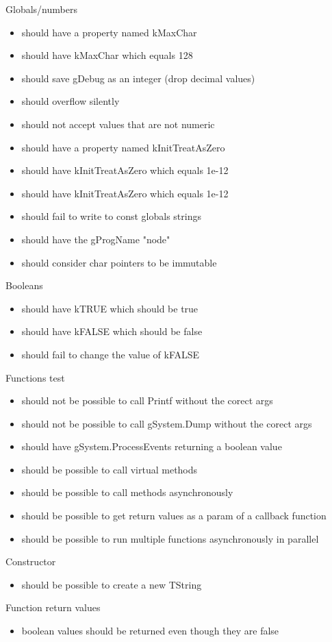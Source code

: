 Globals/numbers
\begin{itemize}
\item should have a property named kMaxChar
\item should have kMaxChar which equals 128
\item should save gDebug as an integer (drop decimal values)
\item should overflow silently
\item should not accept values that are not numeric
\item should have a property named kInitTreatAsZero
\item should have kInitTreatAsZero which equals 1e-12
\item should have kInitTreatAsZero which equals 1e-12
\item should fail to write to const globals strings
\item should have the gProgName "node"
\item should consider char pointers to be immutable
\end{itemize}

Booleans
\begin{itemize}
\item should have kTRUE which should be true
\item should have kFALSE which should be false
\item should fail to change the value of kFALSE
\end{itemize}

Functions test
\begin{itemize}
\item should not be possible to call Printf without the corect args
\item should not be possible to call gSystem.Dump without the corect args
\item should have gSystem.ProcessEvents returning a boolean value
\item should be possible to call virtual methods
\item should be possible to call methods asynchronously
\item should be possible to get return values as a param of a callback function
\item should be possible to run multiple functions asynchronously in parallel
\end{itemize}

Constructor
\begin{itemize}
\item should be possible to create a new TString
\end{itemize}

Function return values
\begin{itemize}
\item boolean values should be returned even though they are false
\end{itemize}
